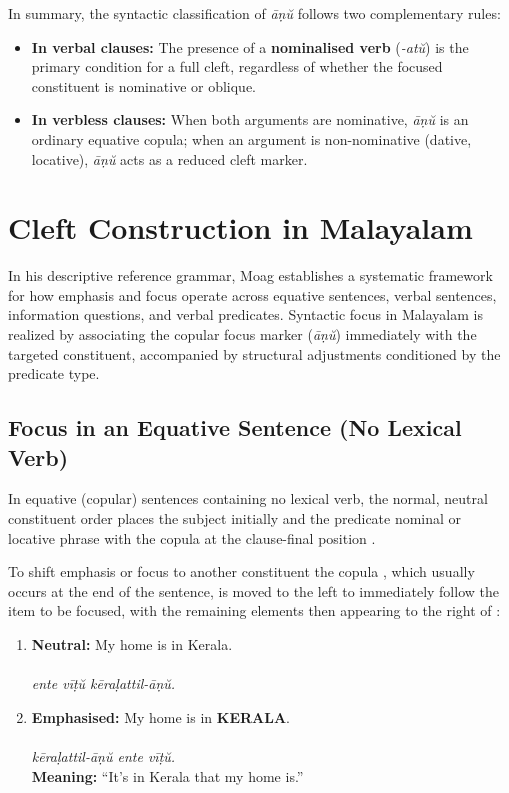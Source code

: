 In summary, the syntactic classification of \textit{āṇŭ} follows two complementary rules:
\begin{itemize}[noitemsep]
    \item \textbf{In verbal clauses:} The presence of a \textbf{nominalised verb} (\textit{-atŭ}) is the primary condition for a full cleft, regardless of whether the focused constituent is nominative or oblique.
    \item \textbf{In verbless clauses:} When both arguments are nominative, \textit{āṇŭ} is an ordinary equative copula; when an argument is non-nominative (dative, locative), \textit{āṇŭ} acts as a reduced cleft marker.
\end{itemize}

\section{Cleft Construction in Malayalam}
\label{sec:moag_focus_typology}

In his descriptive reference grammar, Moag \citep{moag2002malayalam} establishes a systematic framework for how emphasis and focus operate across equative sentences, verbal sentences, information questions, and verbal predicates. Syntactic focus in Malayalam is realized by associating the copular focus marker  (\textit{āṇŭ}) immediately with the targeted constituent, accompanied by structural adjustments conditioned by the predicate type.

\subsection{Focus in an Equative Sentence (No Lexical Verb)}
In equative (copular) sentences containing no lexical verb, the normal, neutral constituent order places the subject initially and the predicate nominal or locative phrase with the copula  at the clause-final position \citep[§11.2, p.~162]{moag2002malayalam}.

To shift emphasis or focus to another constituent the copula , which usually occurs at the end of the sentence, is moved to the left to immediately follow the item to be focused, with the remaining elements then appearing to the right of :

\begin{enumerate}[label=\textbf{\arabic*.}]
    \item \textbf{Neutral:} My home is in Kerala. \citep[§11.2, p.~162]{moag2002malayalam}\\
    \\
    \textit{ente vīṭŭ kēraḷattil-āṇŭ.}

    \item \textbf{Emphasised:} My home is in \textbf{KERALA}. \citep[§11.2, p.~162]{moag2002malayalam}\\
    \\
    \textit{kēraḷattil-āṇŭ ente vīṭŭ.}\\
    \textbf{Meaning:} ``It's in Kerala that my home is.''
\end{enumerate}

